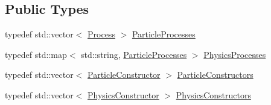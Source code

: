 \subsection*{Public Types}
\begin{DoxyCompactItemize}
\item 
typedef std\+::vector$<$ \hyperlink{class_d_d4hep_1_1_simulation_1_1_geant4_physics_list_1_1_process}{Process} $>$ \hyperlink{class_d_d4hep_1_1_simulation_1_1_geant4_physics_list_adf5c4ae6ed4befac883cf5f253f4220e}{Particle\+Processes}
\item 
typedef std\+::map$<$ std\+::string, \hyperlink{class_d_d4hep_1_1_simulation_1_1_geant4_physics_list_adf5c4ae6ed4befac883cf5f253f4220e}{Particle\+Processes} $>$ \hyperlink{class_d_d4hep_1_1_simulation_1_1_geant4_physics_list_ab41e55687c9d57878fe2e6847a31f19a}{Physics\+Processes}
\item 
typedef std\+::vector$<$ \hyperlink{class_d_d4hep_1_1_simulation_1_1_geant4_physics_list_1_1_particle_constructor}{Particle\+Constructor} $>$ \hyperlink{class_d_d4hep_1_1_simulation_1_1_geant4_physics_list_afaee3763aea79b299830be37f9642342}{Particle\+Constructors}
\item 
typedef std\+::vector$<$ \hyperlink{class_d_d4hep_1_1_simulation_1_1_geant4_physics_list_1_1_physics_constructor}{Physics\+Constructor} $>$ \hyperlink{class_d_d4hep_1_1_simulation_1_1_geant4_physics_list_a5953826b626c21fa4b26ab9a07f3b8ad}{Physics\+Constructors}
\end{DoxyCompactItemize}
